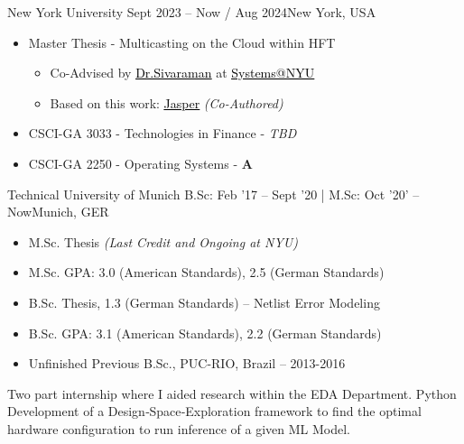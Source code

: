 \documentclass[10pt,a4paper,ragged2e,withhyper]{altacv}
\begin{document}
\begin{paracol}{2}

        {New York University}
        {Sept 2023 -- Now / Aug 2024}{New York, USA}
\begin{itemize}
\item Master Thesis - Multicasting on the Cloud within HFT 
    \begin{itemize}
        \item Co-Advised by \href{https://anirudhsk.github.io/}{{\textcolor{black}{\underline{Dr.Sivaraman}}}} at \href{https://news.cs.nyu.edu/}{{\textcolor{black}{\underline{Systems@NYU}}}}
        \item Based on this work: \href{https://arxiv.org/abs/2402.09527}{{\textcolor{black}{\underline{Jasper}}}} \textit{(Co-Authored)}
    \end{itemize}
\item CSCI-GA 3033  - Technologies in Finance - \textit{TBD}
\item CSCI-GA 2250  - Operating Systems - \textbf{A}
\end{itemize}

\divider

        {Technical University of Munich}
        {B.Sc: Feb '17 -- Sept '20 | M.Sc: Oct '20' -- Now}{Munich, GER}
\begin{itemize}
\item M.Sc. Thesis \textit{(Last Credit and Ongoing at NYU)}
\item M.Sc. GPA: 3.0 (American Standards), 2.5 (German Standards) 
\item B.Sc. Thesis, 1.3 (German Standards) -- Netlist Error Modeling
\item B.Sc. GPA: 3.1 (American Standards), 2.2 (German Standards)
\item Unfinished Previous B.Sc., PUC-RIO, Brazil -- 2013-2016
\end{itemize}
\divider


Two part internship where I aided research within the EDA Department. Python Development of a Design‑Space‑Exploration 
framework to find the optimal hardware configuration to run inference of a given ML Model.


\end{paracol}
\end{document}
